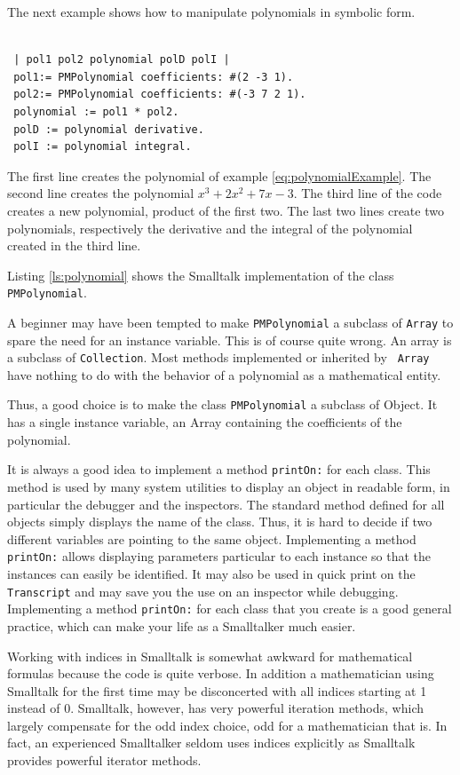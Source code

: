\documentclass[twoside]{book}
\begin{document}
The next example shows how to manipulate polynomials in symbolic
form.
\begin{codeExample}
\begin{verbatim}

 | pol1 pol2 polynomial polD polI |
 pol1:= PMPolynomial coefficients: #(2 -3 1).
 pol2:= PMPolynomial coefficients: #(-3 7 2 1).
 polynomial := pol1 * pol2.
 polD := polynomial derivative.
 polI := polynomial integral.
\end{verbatim}
\end{codeExample}
The first line creates the  polynomial of example
\ref{eq:polynomialExample}. The second line creates the polynomial
$x^3+2x^2+7x-3$. The third line of the code creates a new
polynomial, product of the first two. The last two lines create
two polynomials, respectively the derivative and the integral of
the polynomial created in the third line.

Listing \ref{ls:polynomial} shows the Smalltalk implementation of
the class {\tt PMPolynomial}.

A beginner may have been tempted to make {\tt PMPolynomial} a
subclass of {\tt Array} to spare the need for an instance
variable. This is of course quite wrong. An array is a subclass of
{\tt Collection}. Most methods implemented or inherited by {\tt
Array} have nothing to do with the behavior of a polynomial as a
mathematical entity.

Thus, a good choice is to make the class {\tt PMPolynomial} a
subclass of Object. It has a single instance variable, an Array
containing the coefficients of the polynomial.

It is always a good idea to implement a method {\tt printOn:} for
each class. This method is used by many system utilities to
display an object in readable form, in particular the debugger and
the inspectors. The standard method defined for all objects simply
displays the name of the class. Thus, it is hard to decide if two
different variables are pointing to the same object. Implementing
a method {\tt printOn:} allows displaying parameters particular to
each instance so that the instances can easily be identified. It
may also be used in quick print on the {\tt Transcript} and may
save you the use on an inspector while debugging. Implementing a
method {\tt printOn:} for each class that you create is a good
general practice, which can make your life as a Smalltalker much
easier.

Working with indices in Smalltalk is somewhat awkward for
mathematical formulas because the code is quite verbose. In
addition a mathematician using Smalltalk for the first time may be
disconcerted with all indices starting at 1 instead of 0.
Smalltalk, however, has very powerful iteration methods, which
largely compensate for the odd index choice, odd for a
mathematician that is. In fact, an experienced Smalltalker seldom
uses indices explicitly as Smalltalk provides powerful iterator
methods.
\end{document}
